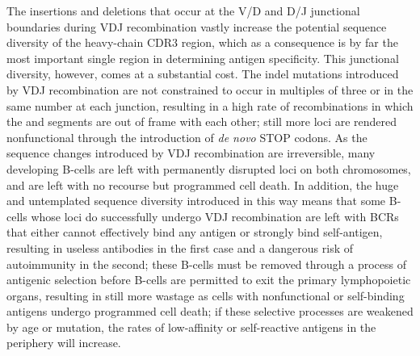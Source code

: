 The insertions and deletions that occur at the V/D and D/J junctional boundaries during VDJ recombination vastly increase the potential sequence diversity of the heavy-chain CDR3 region, which as a consequence is by far the most important single region in determining antigen specificity. This junctional diversity, however, comes at a substantial cost. The indel mutations introduced by VDJ recombination are not constrained to occur in multiples of three or in the same number at each junction, resulting in a high rate of recombinations in which the \vh and \jh segments are out of frame with each other; still more loci are rendered nonfunctional through the introduction of \textit{de novo} STOP codons. As the sequence changes introduced by VDJ recombination are irreversible, many developing B-cells are left with permanently disrupted \igh{} loci on both chromosomes, and are left with no recourse but programmed cell death. In addition, the huge and untemplated sequence diversity introduced in this way means that some B-cells whose \igh{} loci do successfully undergo VDJ recombination are left with BCRs that either cannot effectively bind any antigen or strongly bind self-antigen, resulting in useless antibodies in the first case and a dangerous risk of autoimmunity in the second; these B-cells must be removed through a process of antigenic selection before \naive B-cells are permitted to exit the primary lymphopoietic organs, resulting in still more wastage as cells with nonfunctional or self-binding antigens undergo programmed cell death; if these selective processes are weakened by age or mutation, the rates of low-affinity or self-reactive antigens in the periphery will increase. %






